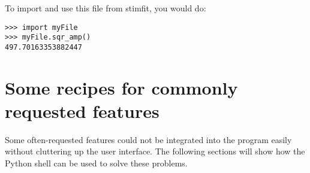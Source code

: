 To import and use this file from stimfit, you would do:
\begin{lstlisting}
>>> import myFile
>>> myFile.sqr_amp()
497.70163353882447
\end{lstlisting}

\section{Some recipes for commonly requested features}
Some often-requested features could not be integrated into the program easily without cluttering up the user interface. The following sections will show how the Python shell can be used to solve these problems.

 
